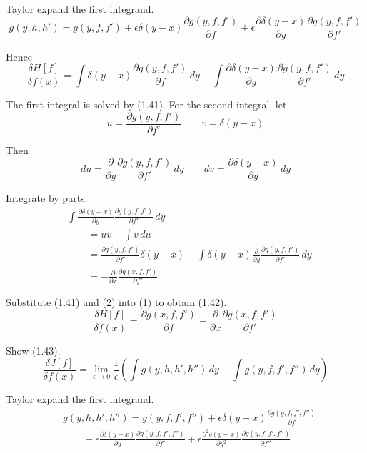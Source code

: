 Taylor expand the first integrand.
\begin{equation*}
g(y,h,h')=g(y,f,f')
+\epsilon\delta(y-x)\frac{\partial g(y,f,f')}{\partial f}
+\epsilon\frac{\partial\delta(y-x)}{\partial y}\frac{\partial g(y,f,f')}{\partial f'}
\end{equation*}

Hence
\begin{equation*}
\frac{\delta H[f]}{\delta f(x)}
=\int\delta(y-x)\frac{\partial g(y,f,f')}{\partial f}\,dy
+\int\frac{\partial\delta(y-x)}{\partial y}\frac{\partial g(y,f,f')}{\partial f'}\,dy
\tag{1}
\end{equation*}

The first integral is solved by (1.41).
For the second integral, let
\begin{equation*}
u=\frac{\partial g(y,f,f')}{\partial f'}
\qquad
v=\delta(y-x)
\end{equation*}

Then
\begin{equation*}
du=\frac{\partial}{\partial y}\frac{\partial g(y,f,f')}{\partial f'}\,dy
\qquad
dv=\frac{\partial\delta(y-x)}{\partial y}\,dy
\end{equation*}

Integrate by parts.
\begin{align*}
&\int\frac{\partial\delta(y-x)}{\partial y}\frac{\partial g(y,f,f')}{\partial f'}\,dy
\\
&\qquad{}=uv-\int v\,du
\\
&\qquad{}=\frac{\partial g(y,f,f')}{\partial f'}\delta(y-x)
-\int\delta(y-x)\frac{\partial}{\partial y}\frac{\partial g(y,f,f')}{\partial f'}\,dy
\\
&\qquad{}=-\frac{\partial}{\partial x}\frac{\partial g(x,f,f')}{\partial f'}
\tag{2}
\end{align*}

Substitute (1.41) and (2) into (1) to obtain (1.42).
\begin{equation*}
\frac{\delta H[f]}{\delta f(x)}
=\frac{\partial g(x,f,f')}{\partial f}
-\frac{\partial}{\partial x}\frac{\partial g(x,f,f')}{\partial f'}
\end{equation*}

Show (1.43).
\begin{equation*}
\frac{\delta J[f]}{\delta f(x)}
=\lim_{\epsilon\rightarrow 0}\frac{1}{\epsilon}
\left(
\int g(y,h,h',h'')\,dy-\int g(y,f,f',f'')\,dy
\right)
\end{equation*}

Taylor expand the first integrand.
\begin{align*}
&g(y,h,h',h'')=g(y,f,f',f'')
+\epsilon\delta(y-x)\frac{\partial g(y,f,f',f'')}{\partial f}
\\
&\qquad{}+\epsilon\frac{\partial\delta(y-x)}{\partial y}\frac{\partial g(y,f,f',f'')}{\partial f'}
+\epsilon\frac{\partial^2\delta(y-x)}{\partial y^2}\frac{\partial g(y,f,f',f'')}{\partial f''}
\end{align*}

